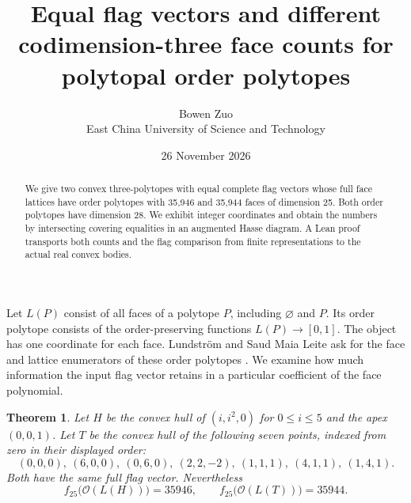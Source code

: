 \documentclass[11pt]{article}
\title{Equal flag vectors and different codimension-three face counts for polytopal order polytopes}
\author{Bowen Zuo\\{\small East China University of Science and Technology}}
\date{26 November 2026}
\newtheorem{theorem}{Theorem}
\begin{document}
\maketitle
\begin{abstract}
We give two convex three-polytopes with equal complete flag vectors whose full face lattices have order polytopes with 35,946 and 35,944 faces of dimension 25. Both order polytopes have dimension 28. We exhibit integer coordinates and obtain the numbers by intersecting covering equalities in an augmented Hasse diagram. A Lean proof transports both counts and the flag comparison from finite representations to the actual real convex bodies.
\end{abstract}

Let \(L(P)\) consist of all faces of a polytope \(P\), including
\(\varnothing\) and \(P\). Its order polytope consists of the
order-preserving functions \(L(P)\to[0,1]\). The object has one
coordinate for each face. Lundstr\"om and Saud Maia Leite ask for
the face and lattice enumerators of these order polytopes
\cite[Question 6.6, preprint v5 Question 6.7]{LS}.
We examine how much information the input flag vector retains in
a particular coefficient of the face polynomial.

\begin{theorem}
Let \(H\) be the convex hull of \((i,i^2,0)\) for \(0\le i\le5\)
and the apex \((0,0,1)\). Let \(T\) be the convex hull of the
following seven points, indexed from zero in their displayed order:
\[
 (0,0,0),\ (6,0,0),\ (0,6,0),\ (2,2,-2),\
 (1,1,1),\ (4,1,1),\ (1,4,1).
\]
Both have the same full flag vector. Nevertheless
\[
 f_{25}\bigl(\mathcal O(L(H))\bigr)=35946,\qquad
 f_{25}\bigl(\mathcal O(L(T))\bigr)=35944.
\]
\end{theorem}
\end{document}
